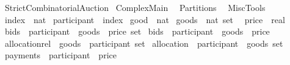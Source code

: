 %
\begin{isabellebody}%
\def\isabellecontext{StrictCombinatorialAuction}%
%
\isamarkuptrue%
%
\isadelimtheory
%
\endisadelimtheory
%
\isatagtheory
{}\isamarkupfalse%
\ StrictCombinatorialAuction\isanewline
{}\ Complex{\isacharunderscore}Main\isanewline
\ \ Partitions\isanewline
\ \ MiscTools\isanewline
\isanewline
{}%
\endisatagtheory
{\isafoldtheory}%
%
\isadelimtheory
%
\endisadelimtheory
%
\isamarkuptrue%
\isamarkupfalse%
\ index\ {\isacharequal}\ {\isachardoublequoteopen}nat{\isachardoublequoteclose}\isanewline
{}\isamarkupfalse%
\ participant\ {\isacharequal}\ index\isanewline
{}\isamarkupfalse%
\ good\ {\isacharequal}\ nat\isanewline
{}\isamarkupfalse%
\ goods\ {\isacharequal}\ {\isachardoublequoteopen}nat\ set{\isachardoublequoteclose}\ \isanewline
{}\isamarkupfalse%
\ price\ {\isacharequal}\ real\isanewline
\isanewline
\isanewline
\isanewline
{}\isamarkupfalse%
\ bids{}\ {\isacharequal}\ {\isachardoublequoteopen}{\isacharparenleft}{\isacharparenleft}participant\ {\isasymtimes}\ goods{\isacharparenright}\ {\isasymtimes}\ price{\isacharparenright}\ set{\isachardoublequoteclose}\isanewline
{}\isamarkupfalse%
\ bids\ {\isacharequal}\ {\isachardoublequoteopen}participant\ {\isasymRightarrow}\ goods\ {\isasymRightarrow}\ price{\isachardoublequoteclose}\isanewline
{}\isamarkupfalse%
\ allocation{\isacharunderscore}rel\ {\isacharequal}\ {\isachardoublequoteopen}{\isacharparenleft}goods\ {\isasymtimes}\ participant{\isacharparenright}\ set{\isachardoublequoteclose}\isanewline
{}\isamarkupfalse%
\ allocation\ {\isacharequal}\ {\isachardoublequoteopen}{\isacharparenleft}participant\ {\isasymtimes}\ goods{\isacharparenright}\ set{\isachardoublequoteclose}\isanewline
\isanewline
\isanewline
{}\isamarkupfalse%
\ payments\ {\isacharequal}\ {\isachardoublequoteopen}participant\ {\isasymRightarrow}\ price{\isachardoublequoteclose}\isanewline
{}\isamarkupfalse%

\end{isabellebody}

